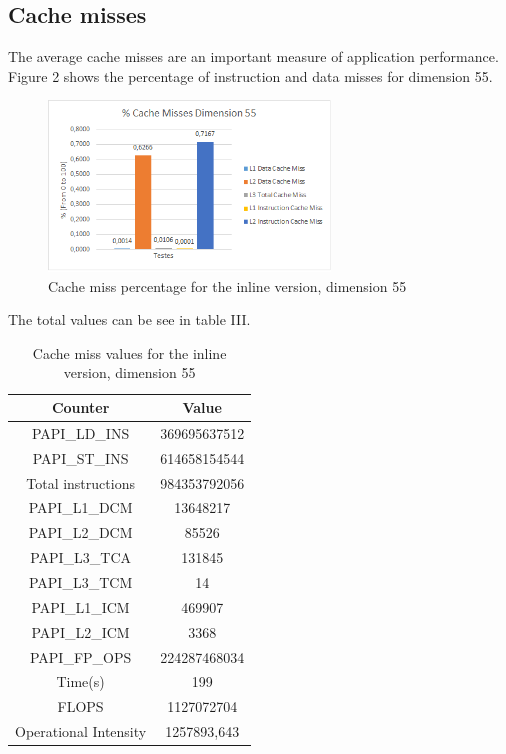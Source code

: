 \documentclass[conference]{IEEEtran}
\begin{document}
\subsection{Cache misses}
The average cache misses are an important measure of application performance. Figure 2 shows the percentage of instruction and data misses for dimension 55. 

\begin{figure}[ht!]
\centering
\includegraphics[width=75mm]{imgSequential/Cachemisses}
\caption{Cache miss percentage for the inline version, dimension 55}
\end{figure}

The total values can be see in table III. 

\begin{table}[H]
\centering
\label{my-label}

\begin{tabular}{|c|c|}
\hline
\rowcolor[HTML]{C0C0c0} 
{\color[HTML]{000000} Counter} & {\color[HTML]{000000} Value}  \\ \hline
PAPI\_LD\_INS                     & 369695637512                 \\ \hline
PAPI\_ST\_INS                     & 614658154544                 \\ \hline
Total instructions                & 984353792056                 \\ \hline
PAPI\_L1\_DCM                     & 13648217                     \\ \hline
PAPI\_L2\_DCM                     & 85526                        \\ \hline
PAPI\_L3\_TCA                     & 131845                       \\ \hline
PAPI\_L3\_TCM                     & 14                           \\ \hline
PAPI\_L1\_ICM                     & 469907                       \\ \hline
PAPI\_L2\_ICM                     & 3368                         \\ \hline
PAPI\_FP\_OPS                     & 224287468034                 \\ \hline
Time(s)                           & 199                          \\ \hline
FLOPS                             & 1127072704                   \\ \hline
Operational Intensity             & 1257893,643                  \\ \hline
\end{tabular}
\caption{Cache miss values for the inline version, dimension 55}
\end{table}
    
\end{document}
